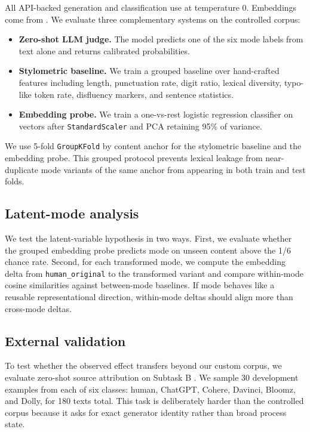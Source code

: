 All API-backed generation and classification use \gptfourone at temperature 0. Embeddings come from \embeddingmodel. We evaluate three complementary systems on the controlled corpus:
\begin{itemize}[leftmargin=*,itemsep=0pt,topsep=2pt]
    \item \textbf{Zero-shot LLM judge.} The model predicts one of the six mode labels from text alone and returns calibrated probabilities.
    \item \textbf{Stylometric baseline.} We train a grouped baseline over hand-crafted features including length, punctuation rate, digit ratio, lexical diversity, typo-like token rate, disfluency markers, and sentence statistics.
    \item \textbf{Embedding probe.} We train a one-vs-rest logistic regression classifier on \embeddingmodel vectors after \texttt{StandardScaler} and PCA retaining 95\% of variance.
\end{itemize}

We use 5-fold \texttt{GroupKFold} by content anchor for the stylometric baseline and the embedding probe. This grouped protocol prevents lexical leakage from near-duplicate mode variants of the same anchor from appearing in both train and test folds.

\subsection{Latent-mode analysis}

We test the latent-variable hypothesis in two ways. First, we evaluate whether the grouped embedding probe predicts mode on unseen content above the 1/6 chance rate. Second, for each transformed mode, we compute the embedding delta from \texttt{human\_original} to the transformed variant and compare within-mode cosine similarities against between-mode baselines. If mode behaves like a reusable representational direction, within-mode deltas should align more than cross-mode deltas.

\subsection{External validation}

To test whether the observed effect transfers beyond our custom corpus, we evaluate zero-shot source attribution on \semeval Subtask B \cite{wang2024semeval}. We sample 30 development examples from each of six classes: human, ChatGPT, Cohere, Davinci, Bloomz, and Dolly, for 180 texts total. This task is deliberately harder than the controlled corpus because it asks for exact generator identity rather than broad process state.

